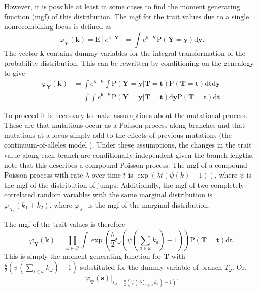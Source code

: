 \documentclass{article}
\newcommand{\E}{\mathrm{E}}
\newcommand{\Pro}{\mathrm{P}}
\begin{document}
However, it is possible at least in some cases to find the moment generating
function (mgf) of this distribution. The mgf for the trait values due to a
single nonrecombining locus is defined as
\begin{equation}
  \label{eq:mgfdef}
  \varphi_{\mathbf{Y}}(\mathbf{k}) = \E\left[ e^{\mathbf{k} \cdot \mathbf{Y}} \right] =
  \int e^{\mathbf{k} \cdot \mathbf{Y}} \Pro(\mathbf{Y}=\mathbf{y}) \mbox{d}\mathbf{y}.
\end{equation}
The vector $\mathbf{k}$ contains dummy variables for the integral transformation
of the probability distribution. This can be rewritten by conditioning on the
genealogy to give
\begin{align}
  \varphi_{\mathbf{Y}}(\mathbf{k}) &= \int e^{\mathbf{k} \cdot \mathbf{Y}}
  \int \Pro(\mathbf{Y}=\mathbf{y} | \mathbf{T}=\mathbf{t}) \Pro(\mathbf{T}=\mathbf{t})
  \mbox{d}\mathbf{t} \mbox{d}\mathbf{y}\\
  &= \int \int e^{\mathbf{k} \cdot \mathbf{Y}} \Pro(\mathbf{Y}=\mathbf{y} | \mathbf{T}=\mathbf{t}) \mbox{d}\mathbf{y}
  \Pro(\mathbf{T}=\mathbf{t})
  \mbox{d}\mathbf{t}.
\end{align}

To proceed it is necessary to make assumptions about the mutational process.
These are that mutations occur as a Poisson process along branches and that
mutations at a locus simply add to the effects of previous mutations (the
continuum-of-alleles model \citep{Kimura1965}). Under these assumptions, the
changes in the trait value along each branch are conditionally independent given
the branch lengths. \citet{Schraiber2015} note that this describes a compound
Poisson process. The mgf of a compound Poisson process with rate $\lambda$ over
time $t$ is $\exp(\lambda t (\psi(k)-1))$, where $\psi$ is the mgf of the
distribution of jumps. Additionally, the mgf of two completely correlated random
variables with the same marginal distribution is $\varphi_{X_1}(k_1+k_2)$, where
$\varphi_{X_1}$ is the mgf of the marginal distribution.

The mgf of the trait values is therefore
\begin{equation}
  \label{eq:fullmgf}
  \varphi_{\mathbf{Y}}(\mathbf{k}) = \prod_{\omega \in \mathcal{O}}
  \int \exp\left( \frac{\theta}{2} t_{\omega} \left( \psi\left(\sum_{a \in \omega}k_{a}\right) -1 \right)\right)
  \Pro(\mathbf{T}=\mathbf{t})\mbox{d}\mathbf{t}.
\end{equation}
This is simply the moment generating function for $\mathbf{T}$ with
$\frac{\theta}{2} \left( \psi(\sum_{i \in \omega}k_{\omega}) -1 \right)$
substituted for the dummy variable of branch $T_{\omega}$. Or,
\begin{equation}
  \label{eq:sub}
  \varphi_{\mathbf{T}}(\mathbf{s})\Bigr|_{s_{\omega}=\frac{\theta}{2} \left( \psi\left(\sum_{a \in \omega}k_{a}\right) -1 \right)}.
\end{equation}
\end{document}
